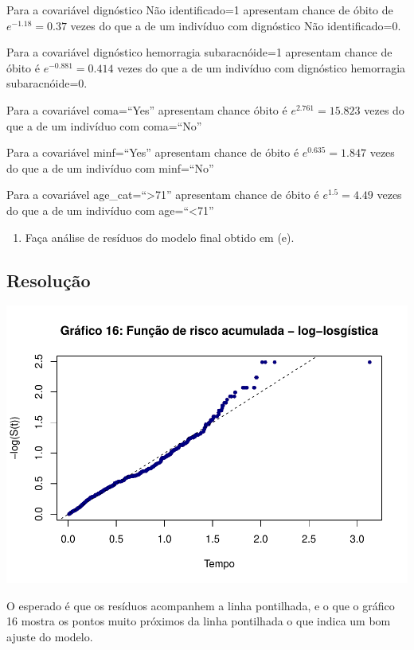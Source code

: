 \documentclass[]{article}
\providecommand{\tightlist}{%
  \setlength{\itemsep}{0pt}\setlength{\parskip}{0pt}}
\begin{document}
Para a covariável dignóstico Não identificado=1 apresentam chance de
óbito de \(e^{-1.18}=0.37\) vezes do que a de um indivíduo com
dignóstico Não identificado=0.

Para a covariável dignóstico hemorragia subaracnóide=1 apresentam chance
de óbito é \(e^{-0.881}=0.414\) vezes do que a de um indivíduo com
dignóstico hemorragia subaracnóide=0.

Para a covariável coma=``Yes'' apresentam chance óbito é
\(e^{2.761}=15.823\) vezes do que a de um indivíduo com coma=``No''

Para a covariável minf=``Yes'' apresentam chance de óbito é
\(e^{0.635}=1.847\) vezes do que a de um indivíduo com minf=``No''

Para a covariável age\_cat=``\textgreater{}71'' apresentam chance de
óbito é \(e^{1.5}=4.49\) vezes do que a de um indivíduo com
age=``\textless{}71''

\newpage

\begin{enumerate}
\def\labelenumi{(\alph{enumi})}
\setcounter{enumi}{6}
\tightlist
\item
  Faça análise de resíduos do modelo final obtido em (e).
\end{enumerate}

\subsection{Resolução}\label{resolucao-6}

\begin{center}\includegraphics[width=0.8\linewidth]{Atividade_3_files/figure-latex/unnamed-chunk-22-1} \end{center}

O esperado é que os resíduos acompanhem a linha pontilhada, e o que o
gráfico 16 mostra os pontos muito próximos da linha pontilhada o que
indica um bom ajuste do modelo.
\end{document}
